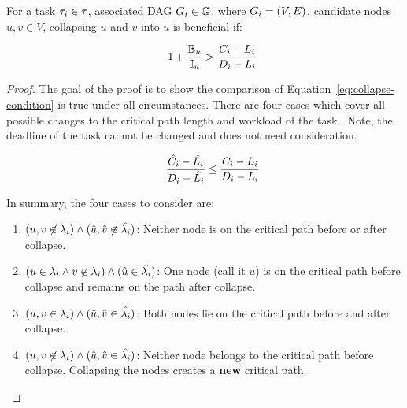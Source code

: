 \begin{theorem} For a task
  ${\tau_{i} \in \tau{}}$, associated DAG ${\Dag{i} \in \dagset}$,
  where ${\Dag{i} = (V, E)}$, candidate nodes ${u,v \in V}$,
  collapsing ${u}$ and ${v}$ into ${u}$ is beneficial if:

  \begin{equation}
    \indent
    1 + \frac{\mathbb{B}_u}{\mathbb{I}_u}
    >
    \frac{\workload{i} - \criticalpathlen{i}}
         {\Deadline{i} - \criticalpathlen{i}}
    \label{eq:condition}
  \end{equation}

  \begin{proof}
    The goal of the proof is to show the comparison of
    Equation~\ref{eq:collapse-condition} is true
    under all circumstances. There are four cases which cover all
    possible changes to the critical path length and workload of the
    task . Note, the deadline of the task  cannot
    be changed and does not need consideration. 

    \begin{equation} \label{eq:collapse-condition}
      \indent
      \frac{\hat{\workload{i}} - \hat{\criticalpathlen{i}}}
           {\Deadline{i} - \hat{\criticalpathlen{i}}} \le
      \frac{\workload{i} - \criticalpathlen{i}}
           {\Deadline{i} - \criticalpathlen{i}}
    \end{equation}

    In summary, the four cases to consider are:

    \begin{enumerate}
    \item ${(u, v \not \in \criticalpath{i})
      \land
      (\hat{u}, \hat{v} \not \in \hat{\criticalpath{i}})}$:
      Neither node is on the critical path
      before or after collapse.
    \item ${(u \in \criticalpath{i} \land v \not \in \criticalpath{i})
      \land
      (\hat{u} \in \hat{\criticalpath{i}})}$: One node (call it ${u}$)
      is on the critical path before collapse and remains on the path
      after collapse.
    \item ${(u,v \in \criticalpath{i}) \land
      (\hat{u},\hat{v} \in \hat{\criticalpath{i}})}$: Both nodes lie
      on the critical path before and after collapse.
    \item ${(u,v \not \in \criticalpath{i}) \land
      (\hat{u},\hat{v} \in \hat{\criticalpath{i}})}$: Neither node
      belongs to the critical path before collapse. Collapsing the
      nodes creates a \textbf{new} critical path.
    \end{enumerate}


\end{proof}
\end{theorem}
